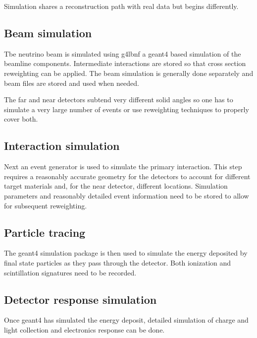\documentclass[../main-00.tex]{subfiles}
\begin{document}
Simulation shares a reconstruction path with real data but begins differently.

\subsection{Beam simulation}\label{sec:use:beamsim}
Tbe neutrino beam is simulated using g4lbnf\cite{g4lbnf} a geant4 based simulation of the beamline components.  Intermediate interactions are stored so that cross section reweighting can be applied.  The beam simulation is generally done separately and beam files are stored and used when needed. 



The far and near detectors subtend very different solid angles so one has to simulate a very large number of events or use reweighting techniques to properly cover both. 


\subsection{Interaction simulation}\label{sec:use:intmodel}
Next an event generator is used to simulate the primary interaction.  This step requires a reasonably accurate geometry for the detectors to account for different target materials and, for the near detector, different locations. Simulation parameters and reasonably detailed event information need to be stored to allow for subsequent reweighting.  

\subsection{Particle tracing}\label{sec:use:tracing}
The geant4 simulation package is then used to simulate the energy deposited by final state particles as they pass through the detector.  Both ionization and scintillation signatures need to be recorded.  

\subsection{Detector response simulation}\label{sec:use:detsim}
Once geant4 has simulated the energy deposit, detailed simulation of charge and light collection and electronics response can be done.  
\end{document}
